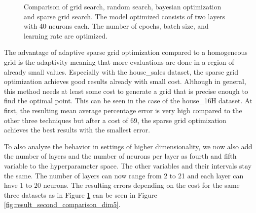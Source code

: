 \begin{figure}[htb!]
	\caption{ Comparison of grid search, random search, bayesian optimization and sparse grid search. The model optimized consists of two layers with 40 neurons each. The number of epochs, batch size, and learning rate are optimized.  }	
	\label{fig:result_second_comparison_dim3}
\end{figure}


The advantage of adaptive sparse grid optimization compared to a homogeneous grid is the adaptivity meaning that more evaluations are done in a region of already small values. Especially with the house\_sales dataset, the sparse grid optimization achieves good results already with small cost. Although in general, this method needs at least some cost to generate a grid that is precise enough to find the optimal point. This can be seen in the case of the house\_16H dataset. At first, the resulting mean average percentage error is very high compared to the other three techniques but after a cost of 69, the sparse grid optimization achieves the best results with the smallest error. \newline 

To also analyze the behavior in settings of higher dimensionality, we now also add the number of layers and the number of neurons per layer as fourth and fifth variable to the hyperparameter space. The other variables and their intervals stay the same. The number of layers can now range from 2 to 21 and each layer can have 1 to 20 neurons. The resulting errors depending on the cost for the same three datasets as in Figure \ref{fig:result_second_comparison_dim3} can be seen in Figure \ref{fig:result_second_comparison_dim5}.


